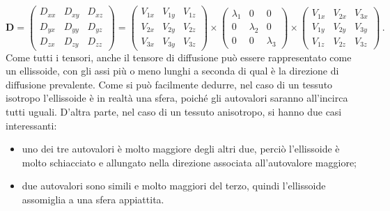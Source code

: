 \documentclass{report}
\numberwithin{equation}{section}
\numberwithin{figure}{section}
\renewcommand{\Vec}{\bm}
\begin{document}
\begin{equation}
    \Vec{D} = 
     \begin{pmatrix}
      D_{xx} & D_{xy} & D_{xz} \\
      D_{yx} & D_{yy} & D_{yz} \\
      D_{zx} & D_{zy} & D_{zz}
     \end{pmatrix}
    =
     \begin{pmatrix}
      V_{1x} & V_{1y} & V_{1z} \\
      V_{2x} & V_{2y} & V_{2z} \\
      V_{3x} & V_{3y} & V_{3z}
     \end{pmatrix}
    \times
     \begin{pmatrix}
      \lambda_1 & 0         & 0         \\
      0         & \lambda_2 & 0         \\
      0         & 0         & \lambda_3
     \end{pmatrix}
    \times
    \begin{pmatrix}
     V_{1x} & V_{2x} & V_{3x} \\
     V_{1y} & V_{2y} & V_{3y} \\
     V_{1z} & V_{2z} & V_{3z}
    \end{pmatrix}\,.
\end{equation}
Come tutti i tensori, anche il tensore di diffusione può essere rappresentato come un ellissoide, con gli assi più o meno lunghi a seconda di qual è la direzione di diffusione prevalente. Come si può facilmente dedurre, nel caso di un tessuto isotropo l'ellissoide è in realtà una sfera, poiché gli autovalori saranno all'incirca tutti uguali. D'altra parte, nel caso di un tessuto anisotropo, si hanno due casi interessanti:
\begin{itemize}[label=$-$]
    \item uno dei tre autovalori è molto maggiore degli altri due, perciò l'ellissoide è molto schiacciato e allungato nella direzione associata all'autovalore maggiore;
    \item due autovalori sono simili e molto maggiori del terzo, quindi l'ellissoide assomiglia a una sfera appiattita.
\end{itemize}
\end{document}
